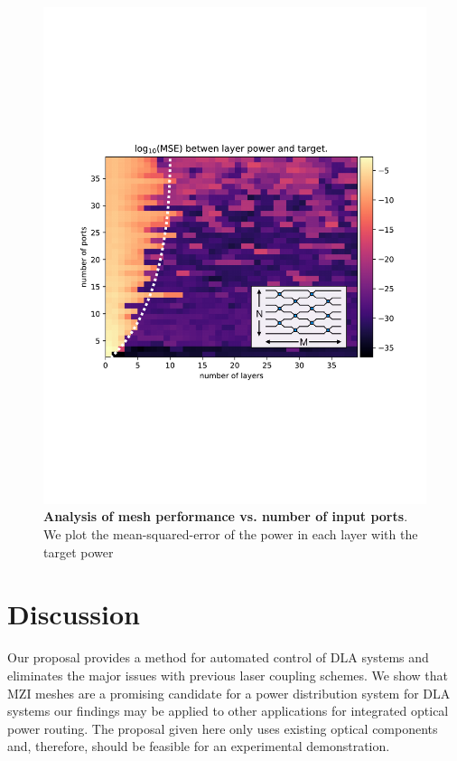 \documentclass[%
 reprint,
 amsmath,amssymb,
 aps,
prstab,
floatfix,
]{revtex4-1}
\begin{document}
\begin{figure}
\includegraphics[width=1\columnwidth]{Fig5.pdf}
\caption{\label{fig:scaling} \textbf{Analysis of mesh performance vs. number of input ports}.  We plot the mean-squared-error of the power in each layer with the target power}
\end{figure}

\section{\label{sec:discussion}Discussion}

Our proposal provides a method for automated control of DLA systems and eliminates the major issues with previous laser coupling schemes.  We show that MZI meshes are a promising candidate for a power distribution system for DLA systems our findings may be applied to other applications for integrated optical power routing.  The proposal given here only uses existing optical components and, therefore, should be feasible for an experimental demonstration.
\end{document}
